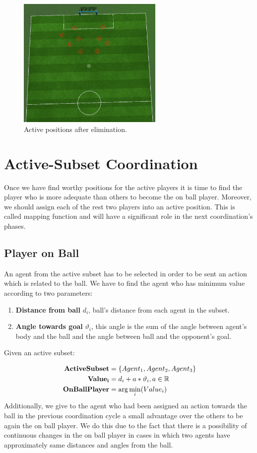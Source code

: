 \begin{figure}[t!]
\centering
  \includegraphics[width=7cm]{Chapter4/figures/Active3.png}
  \caption{Active positions after elimination.} 
  \label{fig:ActivePositions3}
\end{figure}


\section{Active-Subset Coordination}
Once we have find worthy positions for the active players it is time to find the player who is more adequate than others to become the on ball player. Moreover, we should assign each of the rest two players into an active position. This is called mapping function and will have a significant role in the next coordination's phases. 
\subsection{Player on Ball}
An agent from the active subset has to be selected in order to be sent an action which is related to the ball. We have to find the agent who has minimum value according to two parameters:
\begin{enumerate}
\item \textbf{Distance from ball} $d_{i}$, ball's distance from each agent in the subset. 
\item \textbf{Angle towards goal} $\vartheta_{i}$, this angle is the sum of  the angle between agent's body and the ball and the angle between ball and the opponent's goal.
\end{enumerate}
Given an active subset:

\begin{align*}\
{\bf ActiveSubset} &= \lbrace Agent_{1},Agent_{2},Agent_{3} \rbrace  \\
{\bf Value_{i}} &= d_{i} + a \ast \vartheta_{i}, a\in\mathbb{R} \\
{\bf OnBallPlayer} &= \arg\min_{i}(Value_{i})
\end{align*}
Additionally, we give to the agent who had been assigned an action towards the ball in the previous coordination cycle a small advantage over the others to be again the on ball player. We do this due to the fact that there is a possibility of continuous changes in the on ball player in cases in which two agents have approximately same distances and angles from the ball.



